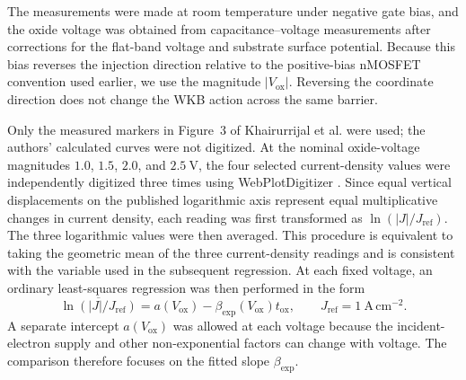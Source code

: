 \documentclass[12pt]{article}
\begin{document}
The measurements were made at room temperature under negative gate bias, and the oxide voltage was obtained from capacitance--voltage measurements after corrections for the flat-band voltage and substrate surface potential. Because this bias reverses the injection direction relative to the positive-bias nMOSFET convention used earlier, we use the magnitude \(\lvert V_{\mathrm{ox}}\rvert\). Reversing the coordinate direction does not change the WKB action across the same barrier.

Only the measured markers in Figure~3 of Khairurrijal et al. were used; the authors' calculated curves were not digitized. At the nominal oxide-voltage magnitudes \(1.0\), \(1.5\), \(2.0\), and \(2.5~\mathrm{V}\), the four selected current-density values were independently digitized three times using WebPlotDigitizer \cite{rohatgiWebPlotDigitizer}. Since equal vertical displacements on the published logarithmic axis represent equal multiplicative changes in current density, each reading was first transformed as \(\ln(|J|/J_{\mathrm{ref}})\). The three logarithmic values were then averaged. This procedure is equivalent to taking the geometric mean of the three current-density readings and is consistent with the variable used in the subsequent regression. At each fixed voltage, an ordinary least-squares regression was then performed in the form
\begin{equation}
    \overline{\ln\left(|J|/J_{\mathrm{ref}}\right)}
    =
    a(V_{\mathrm{ox}})
    -
    \beta_{\mathrm{exp}}(V_{\mathrm{ox}})t_{\mathrm{ox}},
    \qquad
    J_{\mathrm{ref}}=1~\mathrm{A\,cm^{-2}}.
    \label{eq:khairurrijal-fixed-voltage-fit}
\end{equation}
A separate intercept \(a(V_{\mathrm{ox}})\) was allowed at each voltage because the incident-electron supply and other non-exponential factors can change with voltage. The comparison therefore focuses on the fitted slope \(\beta_{\mathrm{exp}}\).
\end{document}
